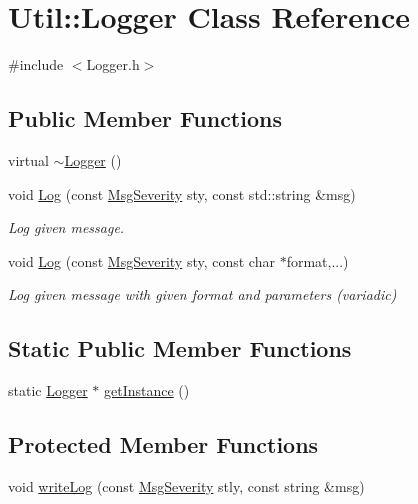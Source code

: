 \hypertarget{class_util_1_1_logger}{}\section{Util\+:\+:Logger Class Reference}
\label{class_util_1_1_logger}


{\ttfamily \#include $<$Logger.\+h$>$}

\subsection*{Public Member Functions}
\begin{DoxyCompactItemize}
\item 
virtual \hyperlink{class_util_1_1_logger_a4f52b74e1fe891e49d00bb443923ea4f}{$\sim$\+Logger} ()
\item 
void \hyperlink{class_util_1_1_logger_a9f457135be98053509489251eadae4a2}{Log} (const \hyperlink{namespace_util_ae07fcfc3e173899e58af09fccd9b8b46}{Msg\+Severity} sty, const std\+::string \&msg)
\begin{DoxyCompactList}\small\item\em Log given message. \end{DoxyCompactList}\item 
void \hyperlink{class_util_1_1_logger_aefd750c56bd6b2c3a672a24b87fbaa01}{Log} (const \hyperlink{namespace_util_ae07fcfc3e173899e58af09fccd9b8b46}{Msg\+Severity} sty, const char $\ast$format,...)
\begin{DoxyCompactList}\small\item\em Log given message with given format and parameters (variadic) \end{DoxyCompactList}\end{DoxyCompactItemize}
\subsection*{Static Public Member Functions}
\begin{DoxyCompactItemize}
\item 
static \hyperlink{class_util_1_1_logger}{Logger} $\ast$ \hyperlink{class_util_1_1_logger_aa7cd20145d61f5644b5b3a894cb7196e}{get\+Instance} ()
\end{DoxyCompactItemize}
\subsection*{Protected Member Functions}
\begin{DoxyCompactItemize}
\item 
void \hyperlink{class_util_1_1_logger_a8f8aba4858455f3547ac8c6aed5ac57c}{write\+Log} (const \hyperlink{namespace_util_ae07fcfc3e173899e58af09fccd9b8b46}{Msg\+Severity} stly, const string \&msg)
\end{DoxyCompactItemize}


